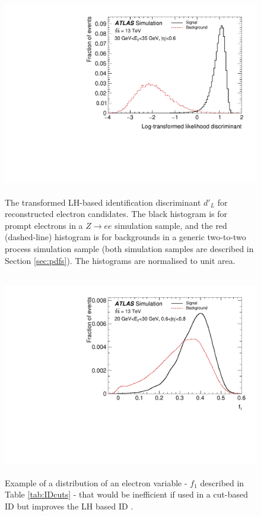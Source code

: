 \begin{figure}[hb!]
    \centering
    \includegraphics[height=3.5in, angle=270]{figures/chapter5/trans_elec_disc.pdf}
    \caption{The transformed LH-based identification discriminant $d'_L$ for reconstructed electron candidates. The black histogram is for prompt electrons in a $Z\rightarrow ee$ simulation sample, and the red (dashed-line) histogram is for backgrounds in a generic two-to-two process simulation sample (both simulation samples are described in Section \ref{sec:pdfs}). The histograms are normalised to unit area.}
    \label{fig:trans_disc}
\end{figure}

\begin{figure}[hb!]
    \centering
    \includegraphics[height=3.5in, angle=270]{figures/chapter5/f1_overlap.pdf}
    \caption{Example of a distribution of an electron variable - $f_1$ described in Table \ref{tab:IDcuts} - that would be inefficient if used in a cut-based ID but improves the LH based ID \cite{run2_elec_paper}.}
    \label{overlap_var}
\end{figure}

